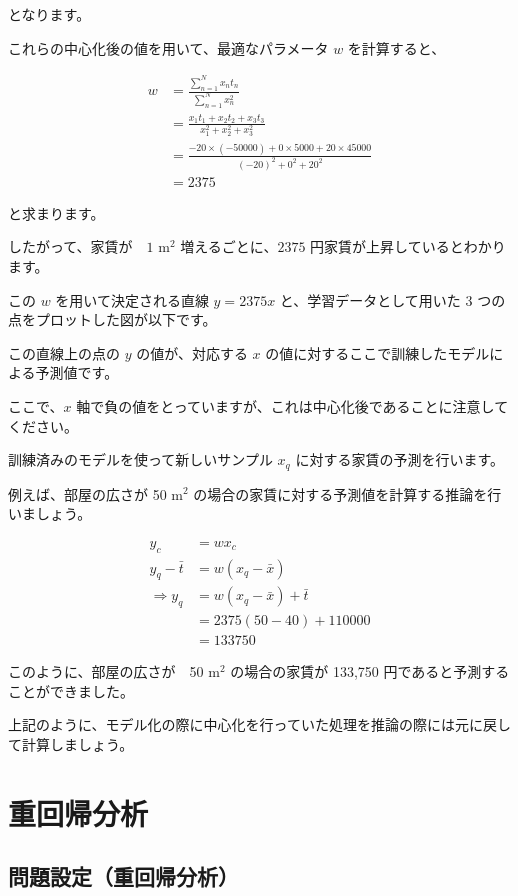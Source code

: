 となります。


これらの中心化後の値を用いて、最適なパラメータ $w$ を計算すると、


\[
\begin{aligned}
w
&= \frac{\sum_{n=1}^N x_n t_n}{\sum_{n=1}^N x_n^2} \\
&= \frac{x_1 t_1 + x_2 t_2 + x_3 t_3}{x_1^2 + x_2^2 + x_3^2} \\
&= \frac{-20 \times (-50000) + 0 \times 5000 + 20 \times 45000}{(-20)^2 + 0^2 + 20^2} \\
&= 2375
\end{aligned}
\]


と求まります。

したがって、家賃が　$1$ m$^{2}$ 増えるごとに、$2375$ 円家賃が上昇しているとわかります。


この $w$ を用いて決定される直線 $y = 2375 x$ と、学習データとして用いた 3 つの点をプロットした図が以下です。




この直線上の点の $y$ の値が、対応する $x$ の値に対するここで訓練したモデルによる予測値です。

ここで、$x$ 軸で負の値をとっていますが、これは中心化後であることに注意してください。


訓練済みのモデルを使って新しいサンプル $x_{q}$ に対する家賃の予測を行います。

例えば、部屋の広さが 50 m$^2$ の場合の家賃に対する予測値を計算する推論を行いましょう。


\[
\begin{aligned}
y_c &= wx_c \\
y_q - \bar{t} &= w(x_q - \bar{x}) \\
\Rightarrow y_q &= w(x_q - \bar{x}) + \bar{t} \\
&= 2375 (50 - 40) + 110000 \\
&= 133750
\end{aligned}
\]


このように、部屋の広さが　50 m$^{2}$ の場合の家賃が 133,750 円であると予測することができました。

上記のように、モデル化の際に中心化を行っていた処理を推論の際には元に戻して計算しましょう。


\section{重回帰分析}


\subsection{問題設定（重回帰分析）}


